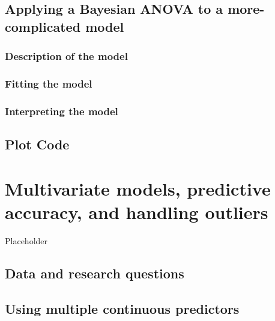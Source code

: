 \documentclass[
]{book}
\begin{document}
\hypertarget{applying-a-bayesian-anova-to-a-more-complicated-model}{%
\section{Applying a Bayesian ANOVA to a more-complicated model}\label{applying-a-bayesian-anova-to-a-more-complicated-model}}

\hypertarget{description-of-the-model-10}{%
\subsection{Description of the model}\label{description-of-the-model-10}}

\hypertarget{fitting-the-model-9}{%
\subsection{Fitting the model}\label{fitting-the-model-9}}

\hypertarget{interpreting-the-model-7}{%
\subsection{Interpreting the model}\label{interpreting-the-model-7}}

\hypertarget{plot-code-7}{%
\section{Plot Code}\label{plot-code-7}}

\hypertarget{multivariate-models-predictive-accuracy-and-handling-outliers}{%
\chapter{Multivariate models, predictive accuracy, and handling outliers}\label{multivariate-models-predictive-accuracy-and-handling-outliers}}

Placeholder

\hypertarget{data-and-research-questions-8}{%
\section{Data and research questions}\label{data-and-research-questions-8}}

\hypertarget{using-multiple-continuous-predictors}{%
\section{Using multiple continuous predictors}\label{using-multiple-continuous-predictors}}
\end{document}
